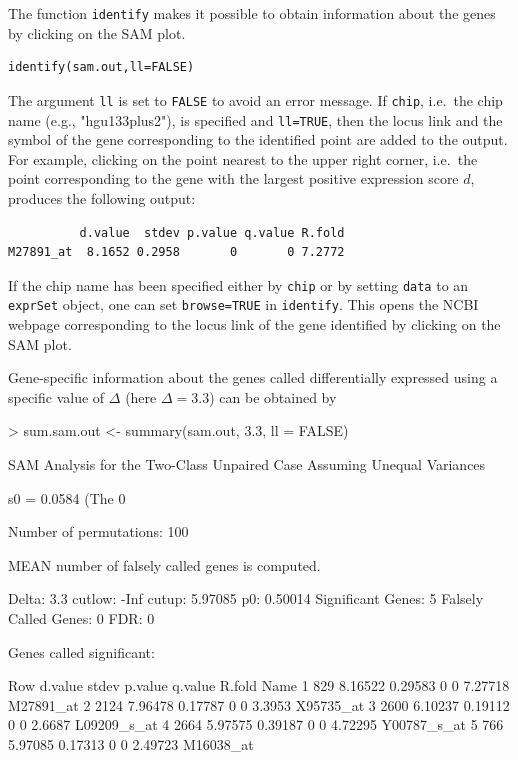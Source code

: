 \documentclass[a4paper]{article}
\begin{document}
The function \texttt{identify} makes it possible to obtain information about the genes by
clicking on the SAM plot.

\begin{verbatim}
identify(sam.out,ll=FALSE)
\end{verbatim}

The argument \texttt{ll} is set to \texttt{FALSE} to avoid an error message. If \texttt{chip},
i.e.\ the chip name (e.g., "hgu133plus2"), is specified and \texttt{ll=TRUE}, then the locus link and the
symbol of the gene corresponding to the identified point are added to the output. For example,
clicking on the point nearest to the upper right corner, i.e.\ the point corresponding to the
gene with the largest positive expression score $d$, produces the following output:

\begin{verbatim}
          d.value  stdev p.value q.value R.fold
M27891_at  8.1652 0.2958       0       0 7.2772
\end{verbatim}

If the chip name has been specified either by \texttt{chip} or by setting \texttt{data} to an
\texttt{exprSet} object, one can set \texttt{browse=TRUE} in \texttt{identify}. This opens the NCBI
webpage corresponding to the locus link of the gene identified by clicking on the SAM plot.

Gene-specific information about the genes called differentially expressed using a specific
value of $\Delta$ (here $\Delta=3.3$) can be obtained by

\begin{Schunk}
\begin{Sinput}
> sum.sam.out <- summary(sam.out, 3.3, ll = FALSE)
\end{Sinput}
\begin{Soutput}
SAM Analysis for the Two-Class Unpaired Case Assuming Unequal Variances 
 
s0 = 0.0584  (The 0 %
 
 Number of permutations: 100  

 MEAN number of falsely called genes is computed.

 Delta: 3.3 
 cutlow: -Inf 
 cutup: 5.97085 
 p0: 0.50014 
 Significant Genes: 5 
 Falsely Called Genes: 0 
 FDR: 0 


Genes called significant:

   Row d.value   stdev p.value q.value  R.fold        Name
1  829 8.16522 0.29583       0       0 7.27718   M27891_at
2 2124 7.96478 0.17787       0       0  3.3953   X95735_at
3 2600 6.10237 0.19112       0       0  2.6687 L09209_s_at
4 2664 5.97575 0.39187       0       0 4.72295 Y00787_s_at
5  766 5.97085 0.17313       0       0 2.49723   M16038_at
\end{Soutput}
\end{Schunk}
\end{document}

